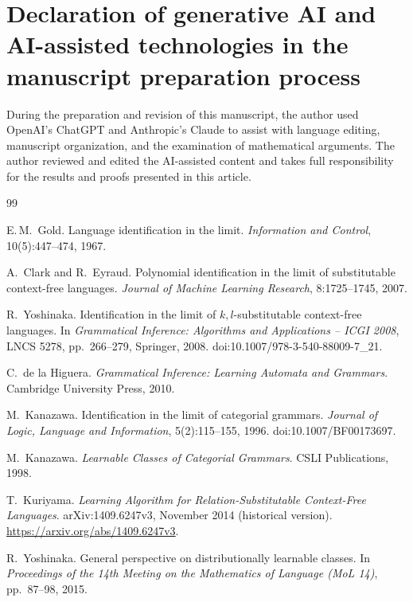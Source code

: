 \documentclass[11pt,a4paper]{article}
\theoremstyle{remark}
\theoremstyle{plain}
\begin{document}
\section*{Declaration of generative AI and AI-assisted technologies in the manuscript preparation process}
During the preparation and revision of this manuscript, the author used
OpenAI's ChatGPT and Anthropic's Claude to assist with language editing,
manuscript organization, and the examination of mathematical arguments.
The author reviewed and edited the AI-assisted content and takes full
responsibility for the results and proofs presented in this article.

\begin{thebibliography}{99}

E.\,M.~Gold.
Language identification in the limit.
\textit{Information and Control}, 10(5):447--474, 1967.

A.~Clark and R.~Eyraud.
Polynomial identification in the limit of substitutable
context-free languages.
\textit{Journal of Machine Learning Research},
8:1725--1745, 2007.

R.~Yoshinaka.
Identification in the limit of $k, l$-substitutable
context-free languages.
In \textit{Grammatical Inference: Algorithms and Applications -- ICGI 2008},
LNCS 5278, pp.~266--279, Springer, 2008.
doi:10.1007/978-3-540-88009-7\_21.

C.~de la Higuera.
\textit{Grammatical Inference: Learning Automata and Grammars}.
Cambridge University Press, 2010.

M.~Kanazawa.
\newblock Identification in the limit of categorial grammars.
\newblock \textit{Journal of Logic, Language and Information},
5(2):115--155, 1996. doi:10.1007/BF00173697.

M.~Kanazawa.
\newblock \emph{Learnable Classes of Categorial Grammars}.
\newblock CSLI Publications, 1998.

T.~Kuriyama.
\newblock \emph{Learning Algorithm for Relation-Substitutable Context-Free Languages}.
\newblock arXiv:1409.6247v3, November 2014 (historical version).
\newblock \url{https://arxiv.org/abs/1409.6247v3}.

R.~Yoshinaka.
\newblock General perspective on distributionally learnable classes.
\newblock In \emph{Proceedings of the 14th Meeting on the Mathematics
of Language (MoL 14)}, pp.~87--98, 2015.


\end{thebibliography}
\end{document}
